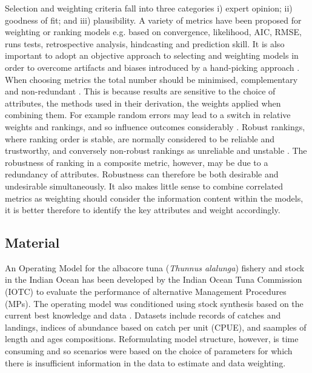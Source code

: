 \documentclass[a4paper]{article}
\begin{document}
Selection and weighting criteria fall into three categories i) expert opinion; ii) goodness of fit; and iii) plausibility. A variety of metrics have been proposed for weighting or ranking models e.g. based on convergence, likelihood, AIC, RMSE, runs tests, retrospective analysis, hindcasting and prediction skill. It is also important to adopt an objective approach to selecting and weighting models in order to overcome artifacts and biases introduced by a hand-picking approach \citep{pechlivanidis2018information}. When choosing metrics the total number should be minimised, complementary and non-redundant \citep{shin2010can, kershner2011selecting}. This is because results are sensitive to the choice of attributes, the methods used in their derivation, the weights applied when combining them. For example random errors may lead to a switch in relative weights and rankings, and so influence outcomes considerably \citep{freyer2014robust}. Robust rankings, where ranking order is stable, are normally considered to be reliable and trustworthy, and conversely non-robust rankings as unreliable and unstable \citep{permanyer2011assessing}. The robustness of ranking in a composite metric, however, may be due to a redundancy of attributes. Robustness can therefore be both desirable and undesirable simultaneously. It also makes little sense to combine correlated metrics
\citep{mcgillivray1991human} as weighting should consider the information content within the models, it is better therefore to identify the key attributes and weight accordingly.

\subsection*{Material}

An Operating Model for the albacore tuna (\textit{Thunnus alalunga}) fishery and stock in the Indian Ocean has been developed by the Indian Ocean Tuna Commission (IOTC) to evaluate the performance of alternative Management Procedures (MPs). The operating model was conditioned using stock synthesis \citep[SS3][]{MethotW2013} based on the current best knowledge and data \citep{ptmt2014}. Datasets include records of catches and landings, indices of abundance based on catch per unit (CPUE), and  saamples of length and ages compositions. Reformulating model structure, however, is time consuming and so scenarios were based on the choice of parameters for which there is insufficient information in the data to estimate and data weighting. 
\end{document}
